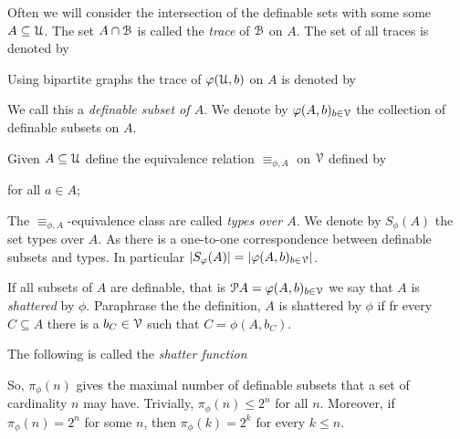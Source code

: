 \documentclass[sputnik.tex]{subfiles}
\begin{document}
\separatore

Often we will consider the intersection of the definable sets with some some $A\subseteq\EuScript U$.
The set  $A\cap\EuScript B$ is called the \emph{trace\/} of $\EuScript B$ on $A$.
The set of all traces is denoted by


Using bipartite graphs the trace of $\varphi(\EuScript U,b)$ on $A$ is denoted by


We call this a \emph{definable subset of $A$}.
We denote by \emph{$\varphi(A,b)_{b\in\EuScript V}$\/} the collection of definable subsets on $A$.

\separatore

Given $A\subseteq\EuScript U$ define the equivalence relation $\equiv_{\phi,A}$ on $\EuScript V$ defined by 

\quad for all $a\in A$;


The $\equiv_{\phi,A}$-equivalence class are called \emph{types over $A$}. We denote by $S_\phi(A)$ the set types over $A$. As there is a one-to-one correspondence between definable subsets and types.
In particular $|S_\varphi(A)|=|\varphi(A,b)_{b\in\EuScript V}|$.

\separatore

If all subsets of $A$ are definable, that is $\EuScript P A=\varphi(A,b)_{b\in\EuScript V}$ we say that $A$ is \emph{shattered\/} by $\phi$.
Paraphrase the the definition,  $A$ is shattered by $\phi$ if fr every $C\subseteq A$ there is a $b_C\in\EuScript V$ such that $C=\phi(A,b_C)$.

The following is called the \emph{shatter function\/}




So, $\pi_\phi(n)$ gives the maximal number of definable subsets that a set of cardinality $n$ may have.
Trivially, $\pi_\phi(n)\le2^n$ for all $n$.
Moreover, if $\pi_\phi(n)=2^n$ for some $n$, then $\pi_\phi(k)=2^k$ for every $k\le n$.
\end{document}
